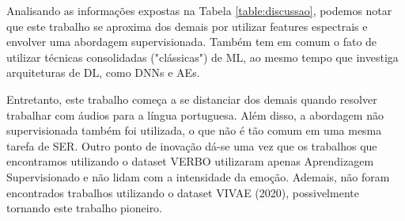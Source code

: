 Analisando as informações expostas na Tabela \ref{table:discussao}, podemos notar que este trabalho se aproxima dos demais por utilizar features espectrais e envolver uma abordagem supervisionada. Também tem em comum o fato de utilizar técnicas consolidadas ("clássicas") de \acrshort{ML}, ao mesmo tempo que investiga arquiteturas de \acrshort{DL}, como \acrshort{DNN}s e \acrshort{AE}s.

Entretanto, este trabalho começa a se distanciar dos demais quando resolver trabalhar com áudios para a língua portuguesa. Além disso, a abordagem não supervisionada também foi utilizada, o que não é tão comum em uma mesma tarefa de \acrshort{SER}. Outro ponto de inovação dá-se uma vez que os trabalhos que encontramos utilizando o dataset VERBO utilizaram apenas Aprendizagem Supervisionado e não lidam com a intensidade da emoção. Ademais, não foram encontrados trabalhos utilizando o dataset VIVAE (2020), possivelmente tornando este trabalho pioneiro.

